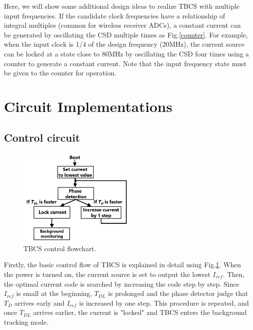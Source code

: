 \documentclass[paper]{ieice}
\begin{document}
Here, we will show some additional design ideas to realize TBCS with multiple input frequencies. If the candidate clock frequencies have a relationship of integral multiples (common for wireless receiver ADCs), a constant current can be generated by oscillating the CSD multiple times as Fig.\ref{counter}. For example, when the input clock is 1/4 of the design frequency (20MHz), the current source can be locked at a state close to 80MHz by oscillating the CSD four times using a counter to generate a constant current. Note that the input frequency state must be given to the counter for operation.


\section{Circuit Implementations}
\subsection{Control circuit}
\begin{figure}[!t]
\centering
 \includegraphics[width=0.5\textwidth]{figs/flowchart.png}
  \caption{TBCS control flowchart.}
\label{flow}
\end{figure}
\qquad Firstly, the basic control flow of TBCS is explained in detail using Fig.\ref{flow}. When the power is turned on, the current source is set to output the lowest $I_{ref}$. Then, the optimal current code is searched by increasing the code step by step. Since $I_{ref}$ is small at the beginning, $T_{DL}$ is prolonged and the phase detector judge that $T_D$ arrives early and $I_{ref}$ is increased by one step. This procedure is repeated, and once $T_{DL}$ arrives earlier, the current is "locked" and TBCS enters the background tracking mode.
\end{document}
